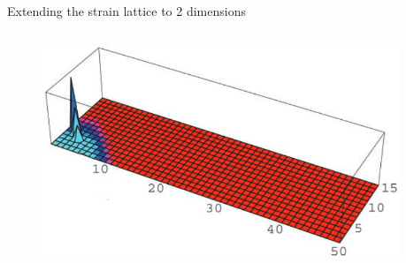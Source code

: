 \documentclass{beamer}
\begin{document}
%         

\begin{frame}{Extending the strain lattice to 2 dimensions}
    \begin{columns}
        \begin{column}{0.5\textwidth}
            \begin{figure}
                \includegraphics[width=\textwidth]{gog_2d_fig/gog_2d_a_1.png}
            \end{figure}        
        \end{column}
        \begin{column}{0.5\textwidth}
        \end{column}
    \end{columns}
    \centering
    \vfill
    \tiny{\cite{gogDynamicsSelectionManystrain2002}}

\end{frame}
\end{document}
